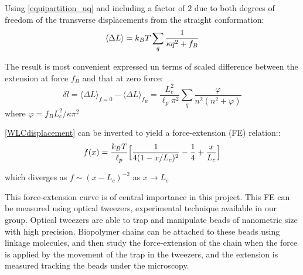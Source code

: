 Using \ref{equipartition_uq} and including a factor of $2$ due to both
degrees of freedom of the transverse displacements from the straight
conformation:
\begin{equation}\label{deltaLmean}
\langle\Delta L\rangle = k_B{}T\sum_q \frac{1}{\kappa{}q^2+f_B}
\end{equation}

The result is most convenient expressed un terms of scaled difference between
the extension at force $f_B$ and that at zero force\citep{storm_nonlinear_2005}:
\begin{equation}\label{WLCdisplacement}
\delta l=\langle\Delta L\rangle_{f=0} - \langle\Delta L\rangle_{f_B} =
\frac{L_c^2}{\ell_p\pi^2} \sum_q \frac{\varphi}{n^2(n^2 + \varphi)}
\end{equation} 
where $\varphi = f_BL_c^2/\kappa{}\pi^2$

\ref{WLCdisplacement} can be inverted to yield a force-extension (FE)
relation:\citep{marko_stretching_1995}:
\begin{equation}\label{FEMarko}
f(x)=\frac{k_B{}T}{\ell_p} \Big[ \frac{1}{4(1 - x/L_c)^2} 
-\frac{1}{4}+\frac{x}{L_c} \Big]
\end{equation}

which diverges as $f \sim (x - L_c)^{-2}$ as $x\rightarrow L_c$

This force-extension curve is of central importance in this project. This FE can
be measured using optical tweezers, experimental technique available in our
group. Optical tweezers are able to trap and manipulate beads of
nanometric size with high
precision\citep{svoboda_direct_1993,svoboda_biological_1994}.
Biopolymer chains can be attached to these beads using linkage molecules, and then study the force-extension of the
chain when the force is applied by the movement of the trap in the tweezers, and
the extension is measured tracking the beads under the microscopy.

